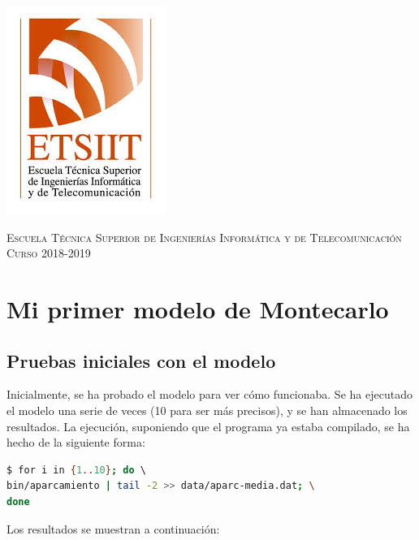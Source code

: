 \documentclass[11pt,a4paper]{report}
\begin{document}
\begin{titlepage}
\begin{minipage}{\textwidth}
\includegraphics[scale=0.3]{img/etsiit.jpeg}

\vspace{0.7cm}
\textsc{Escuela Técnica Superior de Ingenierías Informática y de Telecomunicación}\\
\vspace{1cm}
\textsc{Curso 2018-2019}
\end{minipage}
\end{titlepage}

\tableofcontents
\thispagestyle{empty}				%

\newpage

\setlength{\parskip}{1em}

\chapter{Mi primer modelo de Montecarlo}

\section{Pruebas iniciales con el modelo}

Inicialmente, se ha probado el modelo para ver cómo funcionaba. Se ha ejecutado el modelo una serie de
veces (10 para ser más precisos), y se han almacenado los resultados. La ejecución, suponiendo que
el programa ya estaba compilado, se ha hecho de la siguiente forma:

\begin{lstlisting}[language=bash]
$ for i in {1..10}; do \ 
bin/aparcamiento | tail -2 >> data/aparc-media.dat; \
done
\end{lstlisting}

Los resultados se muestran a continuación:
\end{document}
